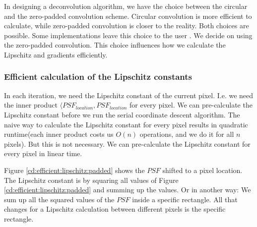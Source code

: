 In designing a deconvolution algorithm, we have the choice between the circular and the zero-padded convolution scheme. Circular convolution is more efficient to calculate, while zero-padded convolution is closer to the reality. Both choices are possible. Some implementations leave this choice to the user \cite{kenyon2019pymoresane}. We decide on using the zero-padded convolution. This choice influences how we calculate the Lipschitz and gradients efficiently.


\subsubsection{Efficient calculation of the Lipschitz constants}
In each iteration, we need the Lipschitz constant of the current pixel. I.e. we need the inner product $\langle PSF_{location}, PSF_{location}$ for every pixel. We can pre-calculate the Lipschitz constant before we run the serial coordinate descent algorithm. The naive way to calculate the Lipschitz constant for every pixel results in quadratic runtime(each inner product costs us $O(n)$ operations, and we do it for all $n$ pixels). But this is not necessary. We can pre-calculate the Lipschitz constant for every pixel in linear time.

Figure \ref{cd:efficient:lipschitz:padded} shows the $PSF$ shifted to a pixel location. The Lipschitz constant is by squaring all values of Figure \ref{cd:efficient:lipschitz:padded} and summing up the values. Or in another way: We sum up all the squared values of the $PSF$ inside a specific rectangle. All that changes for a Lipschitz calculation between different pixels is the specific rectangle.

